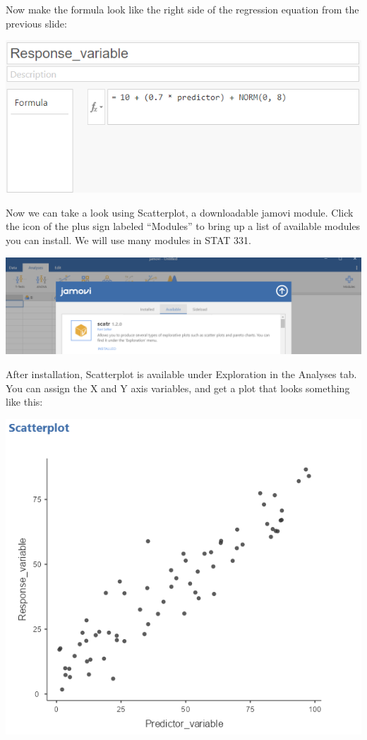\documentclass[
  letterpaper,
  DIV=11,
  numbers=noendperiod]{scrreprt}
\begin{document}
Now make the formula look like the right side of the regression equation
from the previous slide:

\includegraphics{images/mod2_pt1 (9).png}

Now we can take a look using Scatterplot, a downloadable jamovi module.
Click the icon of the plus sign labeled ``Modules'' to bring up a list
of available modules you can install. We will use many modules in STAT
331.

\includegraphics{images/mod2_pt1 (11).png}

After installation, Scatterplot is available under Exploration in the
Analyses tab. You can assign the X and Y axis variables, and get a plot
that looks something like this:

\includegraphics{images/mod2_pt1 (12).png}
\end{document}
